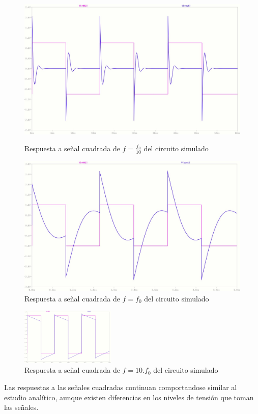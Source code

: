 \begin{figure}[H]
\begin{centering}

	\begin{minipage}[b]{.4\linewidth}
	\centering
	\includegraphics[width=1.1\linewidth]{imagenes/SimCuadrada_f:10}
	\caption{Respuesta a señal cuadrada de $f=\frac{f_0}{10}$ del circuito simulado}
	\end{minipage}
	\hfill
	\begin{minipage}[b]{.4\linewidth}
	\centering
	\includegraphics[width=1.1\linewidth]{imagenes/SimCuadrada_f}
	\caption{Respuesta a señal cuadrada de $f=f_0$ del circuito simulado}
	\end{minipage}
\end{centering}
\pagebreak
\end{figure}
\begin{centering}
\begin{figure}[H]
	\centering	
	\includegraphics[width=0.4\textwidth]{imagenes/SimCuadrada_10f}	\caption{Respuesta a señal cuadrada de $f=10.f_0$ del circuito simulado}
\end{figure}
\end{centering}
Las respuestas a las señales cuadradas continuan comportandose similar al estudio anal\'itico, aunque existen diferencias en los niveles de tensi\'on que toman las señales.


